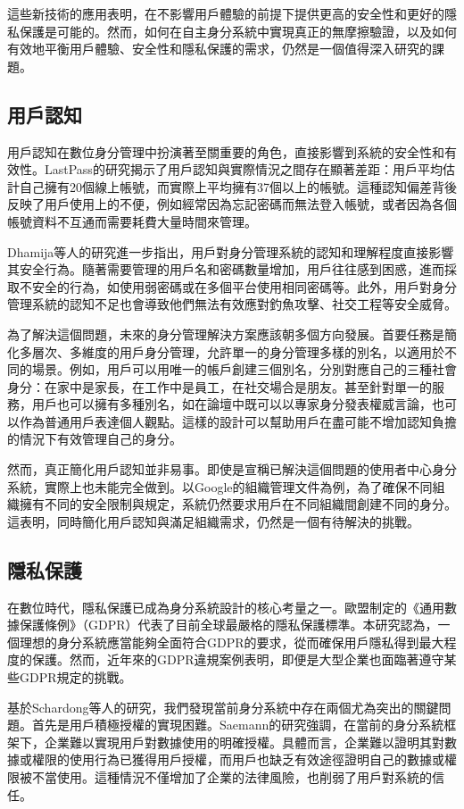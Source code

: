 這些新技術的應用表明，在不影響用戶體驗的前提下提供更高的安全性和更好的隱私保護是可能的。然而，如何在自主身分系統中實現真正的無摩擦驗證，以及如何有效地平衡用戶體驗、安全性和隱私保護的需求，仍然是一個值得深入研究的課題。
\subsection{用戶認知}
用戶認知在數位身分管理中扮演著至關重要的角色，直接影響到系統的安全性和有效性。LastPass\cite{lastpass2020psychology}的研究揭示了用戶認知與實際情況之間存在顯著差距：用戶平均估計自己擁有20個線上帳號，而實際上平均擁有37個以上的帳號。這種認知偏差背後反映了用戶使用上的不便，例如經常因為忘記密碼而無法登入帳號，或者因為各個帳號資料不互通而需要耗費大量時間來管理。

Dhamija等人\cite{dhamija2008sevenflaws}的研究進一步指出，用戶對身分管理系統的認知和理解程度直接影響其安全行為。隨著需要管理的用戶名和密碼數量增加，用戶往往感到困惑，進而採取不安全的行為，如使用弱密碼或在多個平台使用相同密碼等。此外，用戶對身分管理系統的認知不足也會導致他們無法有效應對釣魚攻擊、社交工程等安全威脅。

為了解決這個問題，未來的身分管理解決方案應該朝多個方向發展。首要任務是簡化多層次、多維度的用戶身分管理，允許單一的身分管理多樣的別名，以適用於不同的場景。例如，用戶可以用唯一的帳戶創建三個別名，分別對應自己的三種社會身分：在家中是家長，在工作中是員工，在社交場合是朋友。甚至針對單一的服務，用戶也可以擁有多種別名，如在論壇中既可以以專家身分發表權威言論，也可以作為普通用戶表達個人觀點。這樣的設計可以幫助用戶在盡可能不增加認知負擔的情況下有效管理自己的身分。

然而，真正簡化用戶認知並非易事。即使是宣稱已解決這個問題的使用者中心身分系統，實際上也未能完全做到。以Google的組織管理文件\cite{gcp2024identity}為例，為了確保不同組織擁有不同的安全限制與規定，系統仍然要求用戶在不同組織間創建不同的身分。這表明，同時簡化用戶認知與滿足組織需求，仍然是一個有待解決的挑戰。
\subsection{隱私保護}
在數位時代，隱私保護已成為身分系統設計的核心考量之一。歐盟制定的《通用數據保護條例》（GDPR）\cite{GDPR2016}代表了目前全球最嚴格的隱私保護標準。本研究認為，一個理想的身分系統應當能夠全面符合GDPR的要求，從而確保用戶隱私得到最大程度的保護。然而，近年來的GDPR違規案例表明，即便是大型企業也面臨著遵守某些GDPR規定的挑戰。

基於Schardong等人的研究\cite{s22155641}，我們發現當前身分系統中存在兩個尤為突出的關鍵問題。首先是用戶積極授權的實現困難。Saemann\cite{saemann2022investigating}的研究強調，在當前的身分系統框架下，企業難以實現用戶對數據使用的明確授權。具體而言，企業難以證明其對數據或權限的使用行為已獲得用戶授權，而用戶也缺乏有效途徑證明自己的數據或權限被不當使用。這種情況不僅增加了企業的法律風險，也削弱了用戶對系統的信任。

